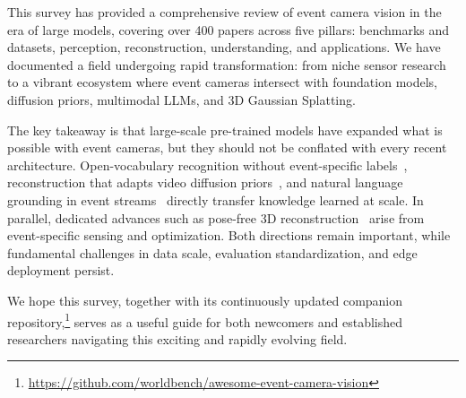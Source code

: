 This survey has provided a comprehensive review of event camera vision in the era of large models, covering over 400 papers across five pillars: benchmarks and datasets, perception, reconstruction, understanding, and applications. We have documented a field undergoing rapid transformation: from niche sensor research to a vibrant ecosystem where event cameras intersect with foundation models, diffusion priors, multimodal LLMs, and 3D Gaussian Splatting.

The key takeaway is that large-scale pre-trained models have expanded what is possible with event cameras, but they should not be conflated with every recent architecture. Open-vocabulary recognition without event-specific labels~\cite{kong2024openess,cho2025ezsr}, reconstruction that adapts video diffusion priors~\cite{chen2025revdm}, and natural language grounding in event streams~\cite{zheng2025talk2event} directly transfer knowledge learned at scale. In parallel, dedicated advances such as pose-free 3D reconstruction~\cite{huang2025inceventgs} arise from event-specific sensing and optimization. Both directions remain important, while fundamental challenges in data scale, evaluation standardization, and edge deployment persist.

We hope this survey, together with its continuously updated companion repository,\footnote{\url{https://github.com/worldbench/awesome-event-camera-vision}} serves as a useful guide for both newcomers and established researchers navigating this exciting and rapidly evolving field.
